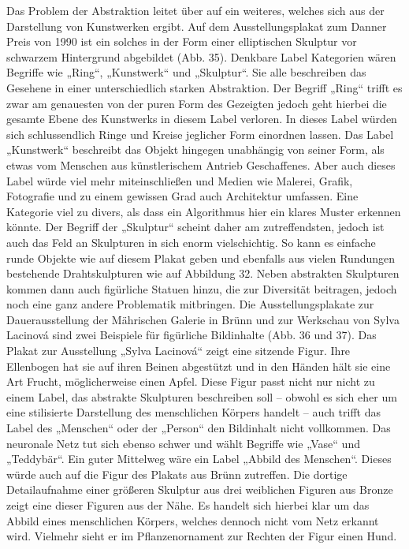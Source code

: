 \documentclass[a4paper,12pt,ngerman]{article}
\begin{document}
Das Problem der Abstraktion leitet über auf ein weiteres, welches sich aus der Darstellung von Kunstwerken ergibt. Auf dem Ausstellungsplakat zum Danner Preis von 1990 ist ein solches in der Form einer elliptischen Skulptur vor schwarzem Hintergrund abgebildet (Abb. 35). Denkbare Label Kategorien wären Begriffe wie „Ring“, „Kunstwerk“ und „Skulptur“. Sie alle beschreiben das Gesehene in einer unterschiedlich starken Abstraktion. Der Begriff „Ring“ trifft es zwar am genauesten von der puren Form des Gezeigten jedoch geht hierbei die gesamte Ebene des Kunstwerks in diesem Label verloren. In dieses Label würden sich schlussendlich Ringe und Kreise jeglicher Form einordnen lassen. Das Label „Kunstwerk“ beschreibt das Objekt hingegen unabhängig von seiner Form, als etwas vom Menschen aus künstlerischem Antrieb Geschaffenes. Aber auch dieses Label würde viel mehr miteinschließen und Medien wie Malerei, Grafik, Fotografie und zu einem gewissen Grad auch Architektur umfassen. Eine Kategorie viel zu divers, als dass ein Algorithmus hier ein klares Muster erkennen könnte. Der Begriff der „Skulptur“ scheint daher am zutreffendsten, jedoch ist auch das Feld an Skulpturen in sich enorm vielschichtig. So kann es einfache runde Objekte wie auf diesem Plakat geben und ebenfalls aus vielen Rundungen bestehende Drahtskulpturen wie auf Abbildung 32. Neben abstrakten Skulpturen kommen dann auch figürliche Statuen hinzu, die zur Diversität beitragen, jedoch noch eine ganz andere Problematik mitbringen. Die Ausstellungsplakate zur Dauerausstellung der Mährischen Galerie in Brünn und zur Werkschau von Sylva Lacinová sind zwei Beispiele für figürliche Bildinhalte (Abb. 36 und 37). Das Plakat zur Ausstellung „Sylva Lacinová“ zeigt eine sitzende Figur. Ihre Ellenbogen hat sie auf ihren Beinen abgestützt und in den Händen hält sie eine Art Frucht, möglicherweise einen Apfel. Diese Figur passt nicht nur nicht zu einem Label, das abstrakte Skulpturen beschreiben soll -- obwohl es sich eher um eine stilisierte Darstellung des menschlichen Körpers handelt -- auch trifft das Label des „Menschen“ oder der „Person“ den Bildinhalt nicht vollkommen. Das neuronale Netz tut sich ebenso schwer und wählt Begriffe wie „Vase“ und „Teddybär“. Ein guter Mittelweg wäre ein Label „Abbild des Menschen“. Dieses würde auch auf die Figur des Plakats aus Brünn zutreffen. Die dortige Detailaufnahme einer größeren Skulptur aus drei weiblichen Figuren aus Bronze zeigt eine dieser Figuren aus der Nähe. Es handelt sich hierbei klar um das Abbild eines menschlichen Körpers, welches dennoch nicht vom Netz erkannt wird. Vielmehr sieht er im Pflanzenornament zur Rechten der Figur einen Hund. \\
\end{document}
